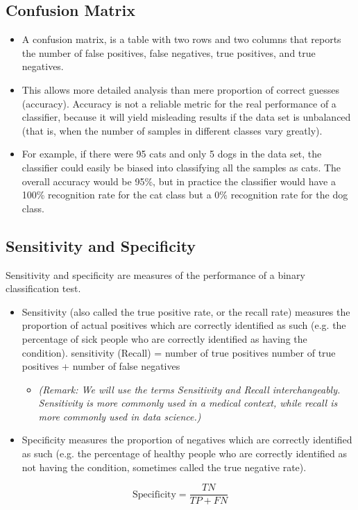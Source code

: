 \subsection*{Confusion Matrix}
\begin{itemize}
	\item A confusion matrix, is a table with two rows and two columns that reports
	the number of false positives, false negatives, true positives, and true
	negatives.
	\item This allows more detailed analysis than mere proportion of correct guesses
	(accuracy). Accuracy is not a reliable metric for the real performance of a
	classifier, because it will yield misleading results if the data set is unbalanced
	(that is, when the number of samples in different classes vary greatly).
	
	\item For example, if there were 95 cats and only 5 dogs in the data set, the
	classifier could easily be biased into classifying all the samples as cats. The
	overall accuracy would be 95\%, but in practice the classifier would have a
	100\% recognition rate for the cat class but a 0\% recognition rate for the dog
	class.
\end{itemize}

\subsection*{Sensitivity and Specificity}
Sensitivity and specificity are measures of the performance of a binary classification
test.
\begin{itemize}
\item Sensitivity (also called the true positive rate, or the recall rate) measures
the proportion of actual positives which are correctly identified
as such (e.g. the percentage of sick people who are correctly identified
as having the condition).
sensitivity (Recall) = number of true positives
number of true positives + number of false negatives
\begin{itemize}
	\item \textit{(Remark: We will use the terms Sensitivity and Recall interchangeably.
	Sensitivity is more commonly used in a medical context, while recall is more
	commonly used in data science.)}
\end{itemize}
\item Specificity measures the proportion of negatives which are correctly
identified as such (e.g. the percentage of healthy people who are correctly
identified as not having the condition, sometimes called the true
negative rate).
\end{itemize}
\[ \mbox{Specificity} = \frac{TN}{TP +FN}\]


